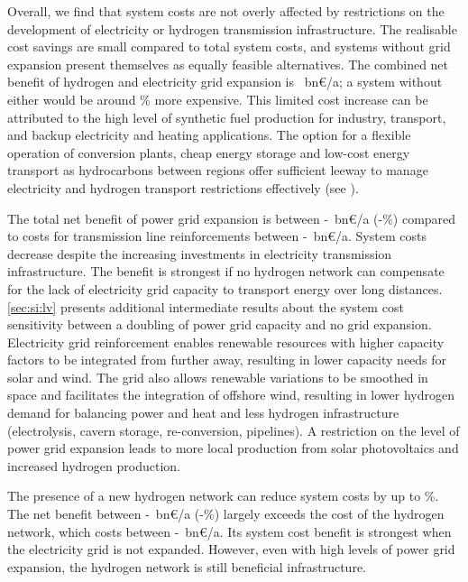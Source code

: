 Overall, we find that system costs are not overly affected by restrictions on
the development of electricity or hydrogen transmission infrastructure. The
realisable cost savings are small compared to total system costs, and systems
without grid expansion present themselves as equally feasible alternatives. The
combined net benefit of hydrogen and electricity grid expansion is
\gridbenefitabs~bn\euro/a; a system without either would be around
\gridbenefitrel\% more expensive. This limited cost increase can be attributed
to the high level of synthetic fuel production for industry, transport, and
backup electricity and heating applications. The option for a flexible operation
of conversion plants, cheap energy storage and low-cost energy transport as
hydrocarbons between regions offer sufficient leeway to manage electricity and
hydrogen transport restrictions effectively (see ).

The total net benefit of power grid expansion is between
\minacbenefitabs-\maxacbenefitabs~bn\euro/a
(\minacbenefitrel-\maxacbenefitrel\%) compared to costs for transmission line
reinforcements between \minaccost-\maxaccost~bn\euro/a. System costs decrease
despite the increasing investments in electricity transmission infrastructure.
The benefit is strongest if no hydrogen network can compensate for the lack of
electricity grid capacity to transport energy over long distances.
\cref{sec:si:lv} presents additional intermediate results about the system cost
sensitivity between a doubling of power grid capacity and no grid expansion.
Electricity grid reinforcement enables renewable resources with higher capacity
factors to be integrated from further away, resulting in lower capacity needs
for solar and wind. The grid also allows renewable variations to be smoothed in
space and facilitates the integration of offshore wind, resulting in lower
hydrogen demand for balancing power and heat and less hydrogen infrastructure
(electrolysis, cavern storage, re-conversion, pipelines). A restriction on the
level of power grid expansion leads to more local production from solar
photovoltaics and increased hydrogen production.

The presence of a new hydrogen network can reduce system costs by up to
\maxhybenefitrel\%. The net benefit between
\minhybenefitabs-\maxhybenefitabs~bn\euro/a
(\minhybenefitrel-\maxhybenefitrel\%) largely exceeds the cost of the hydrogen
network, which costs between \minhycost-\maxhycost~bn\euro/a. Its system cost
benefit is strongest when the electricity grid is not expanded. However, even
with high levels of power grid expansion, the hydrogen network is still
beneficial infrastructure.


